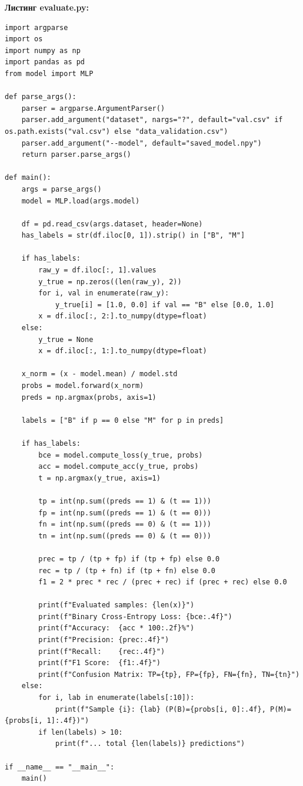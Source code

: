 \documentclass[a4paper,14pt]{extarticle}
\begin{document}
\newpage
\textbf{Листинг evaluate.py:}
\begin{lstlisting}
import argparse
import os
import numpy as np
import pandas as pd
from model import MLP

def parse_args():
    parser = argparse.ArgumentParser()
    parser.add_argument("dataset", nargs="?", default="val.csv" if os.path.exists("val.csv") else "data_validation.csv")
    parser.add_argument("--model", default="saved_model.npy")
    return parser.parse_args()

def main():
    args = parse_args()
    model = MLP.load(args.model)

    df = pd.read_csv(args.dataset, header=None)
    has_labels = str(df.iloc[0, 1]).strip() in ["B", "M"]

    if has_labels:
        raw_y = df.iloc[:, 1].values
        y_true = np.zeros((len(raw_y), 2))
        for i, val in enumerate(raw_y):
            y_true[i] = [1.0, 0.0] if val == "B" else [0.0, 1.0]
        x = df.iloc[:, 2:].to_numpy(dtype=float)
    else:
        y_true = None
        x = df.iloc[:, 1:].to_numpy(dtype=float)

    x_norm = (x - model.mean) / model.std
    probs = model.forward(x_norm)
    preds = np.argmax(probs, axis=1)

    labels = ["B" if p == 0 else "M" for p in preds]

    if has_labels:
        bce = model.compute_loss(y_true, probs)
        acc = model.compute_acc(y_true, probs)
        t = np.argmax(y_true, axis=1)

        tp = int(np.sum((preds == 1) & (t == 1)))
        fp = int(np.sum((preds == 1) & (t == 0)))
        fn = int(np.sum((preds == 0) & (t == 1)))
        tn = int(np.sum((preds == 0) & (t == 0)))

        prec = tp / (tp + fp) if (tp + fp) else 0.0
        rec = tp / (tp + fn) if (tp + fn) else 0.0
        f1 = 2 * prec * rec / (prec + rec) if (prec + rec) else 0.0

        print(f"Evaluated samples: {len(x)}")
        print(f"Binary Cross-Entropy Loss: {bce:.4f}")
        print(f"Accuracy:  {acc * 100:.2f}%")
        print(f"Precision: {prec:.4f}")
        print(f"Recall:    {rec:.4f}")
        print(f"F1 Score:  {f1:.4f}")
        print(f"Confusion Matrix: TP={tp}, FP={fp}, FN={fn}, TN={tn}")
    else:
        for i, lab in enumerate(labels[:10]):
            print(f"Sample {i}: {lab} (P(B)={probs[i, 0]:.4f}, P(M)={probs[i, 1]:.4f})")
        if len(labels) > 10:
            print(f"... total {len(labels)} predictions")

if __name__ == "__main__":
    main()
\end{lstlisting}
\end{document}
